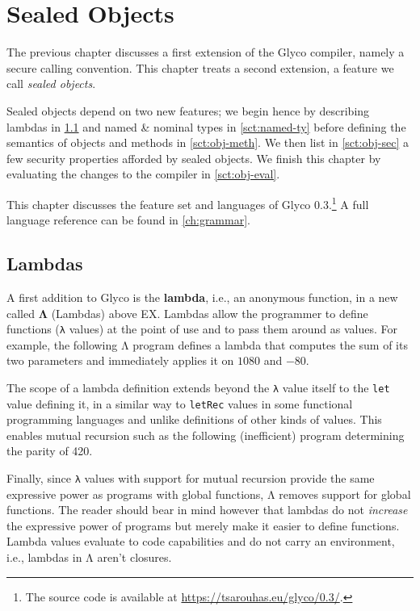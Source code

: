 \documentclass[main.tex]{subfiles}
\begin{document}
\onlyinsubfile{\mainmatter{}}

\chapter{Sealed Objects} \label{ch:obj}
The previous chapter discusses a first extension of the Glyco compiler, namely a secure calling convention. This chapter treats a second extension, a feature we call \emph{sealed objects}.

Sealed objects depend on two new features; we begin hence by describing lambdas in \cref{sct:lambda} and named \& nominal types in \cref{sct:named-ty} before defining the semantics of objects and methods in \cref{sct:obj-meth}. We then list in \cref{sct:obj-sec} a few security properties afforded by sealed objects. We finish this chapter by evaluating the changes to the compiler in \cref{sct:obj-eval}.

This chapter discusses the feature set and languages of Glyco 0.3.\footnote{The source code is available at \url{https://tsarouhas.eu/glyco/0.3/}.} A full language reference can be found in \cref{ch:grammar}.

\section{Lambdas} \label{sct:lambda}
A first addition to Glyco is the \textbf{lambda}, i.e., an anonymous function, in a new  called \textbf{Λ} (Lambdas) above EX. Lambdas allow the programmer to define functions (\texttt{λ} values) at the point of use and to pass them around as values. For example, the following Λ program defines a lambda that computes the sum of its two parameters and immediately applies it on $1080$ and $-80$.

The scope of a lambda definition extends beyond the \texttt{λ} value itself to the \texttt{let} value defining it, in a similar way to \texttt{letRec} values in some functional programming languages and unlike definitions of other kinds of values. This enables mutual recursion such as the following (inefficient) program determining the parity of 420.

Finally, since \texttt{λ} values with support for mutual recursion provide the same expressive power as programs with global functions, Λ removes support for global functions. The reader should bear in mind however that lambdas do not \emph{increase} the expressive power of programs but merely make it easier to define functions. Lambda values evaluate to code capabilities and do not carry an environment, i.e., lambdas in Λ aren't closures.
\end{document}
